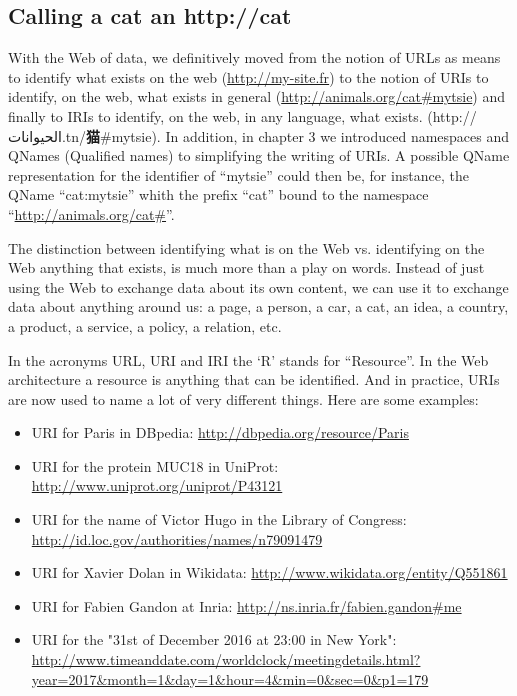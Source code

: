 \hypertarget{calling-a-cat-an-httpcat}{%
\subsection{Calling a cat an
http://cat}\label{calling-a-cat-an-httpcat}}

With the Web of data, we definitively moved from the notion of URLs as
means to identify what exists on the web (\url{http://my-site.fr}) to
the notion of URIs to identify, on the web, what exists in general
(\url{http://animals.org/cat\#mytsie}) and finally to IRIs to identify,
on the web, in any language, what exists.
(http://الحيوانات.tn/\textbf{猫}\#mytsie). In addition, in chapter 3 we
introduced namespaces and QNames (Qualified names) to simplifying the
writing of URIs. A possible QName representation for the identifier of
``mytsie'' could then be, for instance, the QName ``cat:mytsie'' whith
the prefix ``cat'' bound to the namespace
``\url{http://animals.org/cat\#}''.

The distinction between identifying what is on the Web vs. identifying
on the Web anything that exists, is much more than a play on words.
Instead of just using the Web to exchange data about its own content, we
can use it to exchange data about anything around us: a page, a person,
a car, a cat, an idea, a country, a product, a service, a policy, a
relation, etc.

In the acronyms URL, URI and IRI the `R' stands for ``Resource''. In the
Web architecture a resource is anything that can be identified. And in
practice, URIs are now used to name a lot of very different things. Here
are some examples:

\begin{itemize}
\item
  URI for Paris in DBpedia: \url{http://dbpedia.org/resource/Paris}
\item
  URI for the protein MUC18 in UniProt:
  \url{http://www.uniprot.org/uniprot/P43121}
\item
  URI for the name of Victor Hugo in the Library of Congress:
  \url{http://id.loc.gov/authorities/names/n79091479}
\item
  URI for Xavier Dolan in Wikidata:
  \url{http://www.wikidata.org/entity/Q551861}
\item
  URI for Fabien Gandon at Inria:
  \url{http://ns.inria.fr/fabien.gandon\#me}
\item
  URI for the "31st of December 2016 at 23:00 in New York":
  \url{http://www.timeanddate.com/worldclock/meetingdetails.html?year=2017\&month=1\&day=1\&hour=4\&min=0\&sec=0\&p1=179}
\end{itemize}

